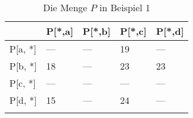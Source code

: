 
\begin{longtable}[c]{|l|l|l|l|l|}
\hline
             & P{[}*,a{]} & P{[}*,b{]} & P{[}*,c{]} & P{[}*,d{]} \\ \hline
\endfirsthead
%
\endhead
%
P{[}a, *{]} & ---        & ---        & 19         & ---        \\ \hline
P{[}b, *{]} & 18         & ---        & 23         & 23         \\ \hline
P{[}c, *{]}  & ---        & ---         & ---        & ---         \\ \hline
P{[}d, *{]}  & 15         & ---         & 24         & ---        \\ \hline
\caption{Die Menge $P$ in Beispiel 1}
\label{beispiel1p}\\
\end{longtable}